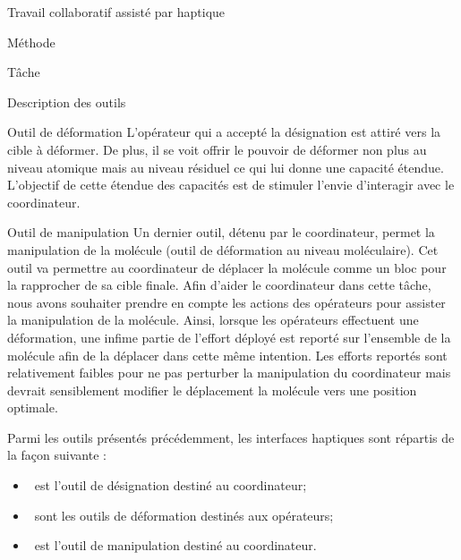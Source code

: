 \documentclass[myfrancais]{mythesis}
\begin{document}
\begin{mychapter}{Travail collaboratif assisté par haptique}
\begin{mysection}{Méthode}
\begin{mysubsection}{Tâche}
\begin{mysubsubsection}{Description des outils}
\begin{myparagraph}{Outil de déformation}
						L'opérateur qui a accepté la désignation est attiré vers la cible à déformer.
						De plus, il se voit offrir le pouvoir de déformer non plus au niveau atomique mais au niveau résiduel ce qui lui donne une capacité étendue.
						L'objectif de cette étendue des capacités est de stimuler l'envie d'interagir avec le coordinateur.
					\end{myparagraph}
					\begin{myparagraph}{Outil de manipulation}
						Un dernier outil, détenu par le coordinateur, permet la manipulation de la molécule (outil de déformation au niveau moléculaire).
						Cet outil va permettre au coordinateur de déplacer la molécule comme un bloc pour la rapprocher de sa cible finale.
						Afin d'aider le coordinateur dans cette tâche, nous avons souhaiter prendre en compte les actions des opérateurs pour assister la manipulation de la molécule.
						Ainsi, lorsque les opérateurs effectuent une déformation, une infime partie de l'effort déployé est reporté sur l'ensemble de la molécule afin de la déplacer dans cette même intention.
						Les efforts reportés sont relativement faibles pour ne pas perturber la manipulation du coordinateur mais devrait sensiblement modifier le déplacement la molécule vers une position optimale.
					\end{myparagraph}

					Parmi les outils présentés précédemment, les interfaces haptiques sont répartis de la façon suivante :
					\begin{itemize}
						\item {}~\myOmni est l'outil de désignation destiné au coordinateur;
						\item {}~\myOmni sont les outils de déformation destinés aux opérateurs;
						\item {}~\myDesktop est l'outil de manipulation destiné au coordinateur.
					\end{itemize}


\end{mysubsubsection}
\end{mysubsection}
\end{mysection}
\end{mychapter}
\end{document}
